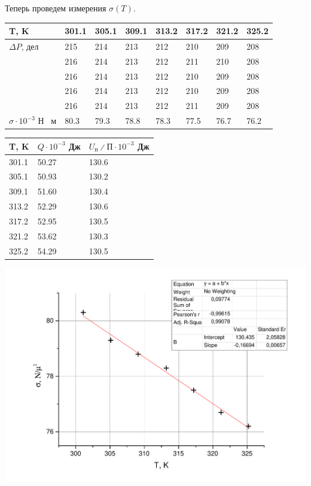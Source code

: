 \documentclass[a4paper,12pt]{article}
\begin{document}
	Теперь проведем измерения $\sigma(T)$.
	\begin{center}
		\begin{table}[h!]
			\begin{tabular}{l|l|l|l|l|l|l|l}
				T, K & 301.1 & 305.1 & 309.1 & 313.2 & 317.2 & 321.2 & 325.2 \\ \hline
	 $\Delta P$, дел & 215 & 214 & 213 & 212 & 210 & 209 & 208 \\
					 & 216 & 214 & 213 & 212 & 211 & 210 & 208 \\
					 & 216 & 214 & 213 & 212 & 210 & 209 & 208 \\
					 & 216 & 214 & 213 & 212 & 210 & 209 & 208 \\
					 & 216 & 214 & 213 & 212 & 211 & 209 & 208 \\ \hline
			$\sigma\cdot 10^{-3}$ Н \ м & 80.3 & 79.3 & 78.8 & 78.3 & 77.5 & 76.7 & 76.2 \\ \hline
			\end{tabular}
		\end{table}
	\end{center}
	
	\begin{center}
		\begin{table}[h!]
			\begin{tabular}{l|l|l}
				T, K & $Q\cdot 10^{-3}$ Дж & $U_\text{п}∕\text{П}\cdot 10^{-3}$ Дж \\ \hline
				301.1 & 50.27 & 130.6 \\
				305.1 & 50.93 & 130.2 \\
				309.1 & 51.60 & 130.4 \\
				313.2 & 52.29 & 130.6 \\
				317.2 & 52.95 & 130.5 \\
				321.2 & 53.62 & 130.3 \\
				325.2 & 54.29 & 130.5 \\ \hline

			\end{tabular}
		\end{table}
	\end{center}
	
	\includegraphics[width = 0.7\linewidth]{sigmaT}
	
\end{document}
